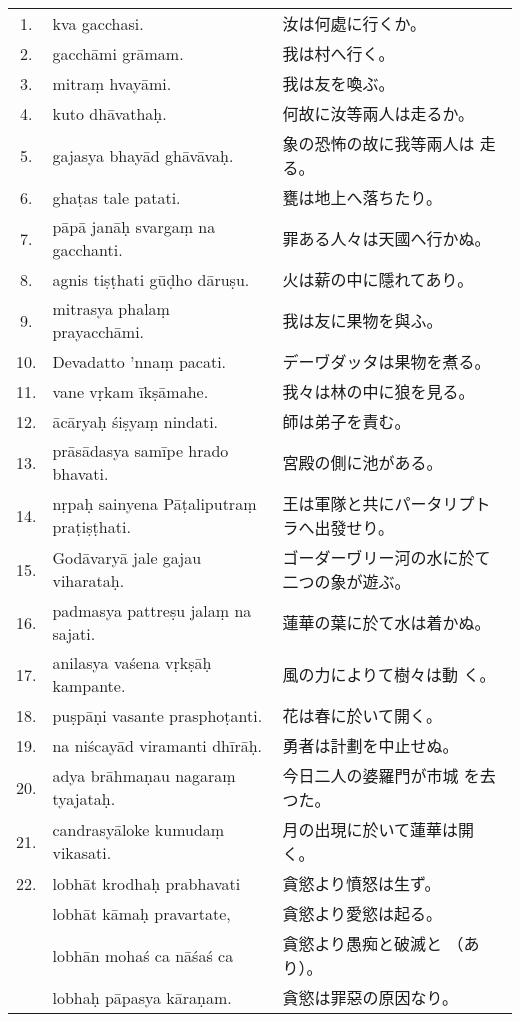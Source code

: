 \begin{longtable}{c*{2}{p{0.45\hsize}}}
 1. & kva gacchasi. & 汝は何處に行くか。\\
 2. & gacchāmi grāmam. & 我は村へ行く。\\
 3. & mitraṃ hvayāmi. & 我は友を喚ぶ。\\
 4. & kuto dhāvathaḥ. & 何故に汝等兩人は走るか。\\
 5. & gajasya bhayād ghāvāvaḥ. & 象の恐怖の故に我等兩人は
走る。\\
 6. & ghaṭas tale patati. & 甕は地上へ落ちたり。\\
 7. & pāpā janāḥ svargaṃ na gacchanti. & 罪ある人々は天國へ行かぬ。\\
 8. & agnis tiṣṭhati gūḍho dāruṣu. & 火は薪の中に隱れてあり。\\
 9. & mitrasya phalaṃ prayacchāmi. & 我は友に果物を與ふ。\\
10. & Devadatto 'nnaṃ pacati. & デーヷダッタは果物を煮る。\\
11. & vane vṛkam īkṣāmahe. & 我々は林の中に狼を見る。\\
12. & ācāryaḥ śiṣyaṃ nindati. & 師は弟子を責む。\\
13. & prāsādasya samīpe hrado bhavati. & 宮殿の側に池がある。\\
14. & nṛpaḥ sainyena Pāṭaliputraṃ praṭiṣṭhati. & 王は軍隊と共にパータリプトラへ出發せり。\\
15. & Godāvaryā jale gajau viha\-rataḥ. & ゴーダーヷリー河の水に於て二つの象が遊ぶ。\\
16. & padmasya pattreṣu jalaṃ na sajati. & 蓮華の葉に於て水は着かぬ。\\
17. & anilasya vaśena vṛkṣāḥ kam\-pante. & 風の力によりて樹々は動
く。\\
18. & puṣpāṇi vasante prasphoṭanti. & 花は春に於いて開く。\\
19. & na niścayād viramanti dhīrāḥ. & 勇者は計劃を中止せぬ。\\
20. & adya brāhmaṇau nagaraṃ tyajataḥ. & 今日二人の婆羅門が市城
を去つた。\\
21. & candrasyāloke kumudaṃ vika\-sati. & 月の出現に於いて蓮華は開
く。\\
22. & lobhāt krodhaḥ prabhavati & 貪慾より憤怒は生ず。\\
    & lobhāt kāmaḥ pravartate, & 貪慾より愛慾は起る。\\
    & lobhān mohaś ca nāśaś ca & 貪慾より愚痴と破滅と
（あり）。\\
    & lobhaḥ pāpasya kāraṇam. & 貪慾は罪惡の原因なり。
\end{longtable}


